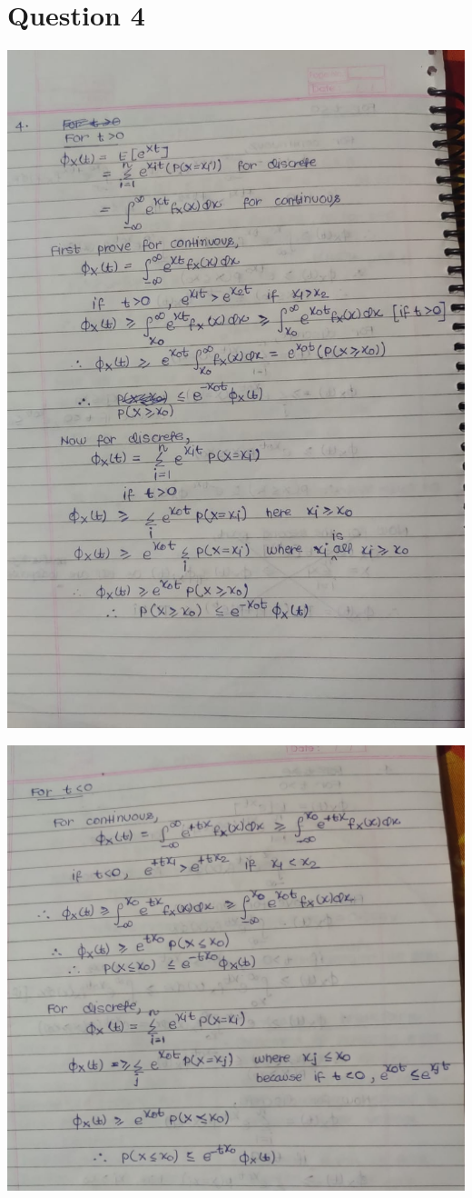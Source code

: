 \documentclass{article}
\theoremstyle{remark}
\begin{document}
\section{Question 4}
\includegraphics[width=\textwidth, height=\textheight, keepaspectratio]{4a.jpeg} \par
\includegraphics[width=\textwidth, height=\textheight, keepaspectratio]{4b.jpeg} \par
\end{document}
